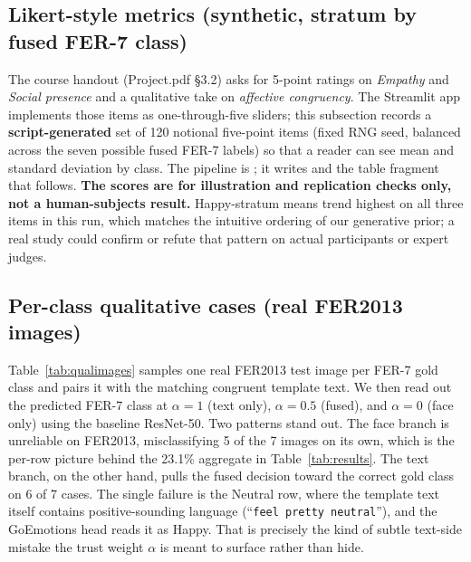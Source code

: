 \documentclass[sigconf,nonacm]{acmart}
\begin{document}
\subsection{Likert-style metrics (synthetic, stratum by fused FER-7 class)}
The course handout (Project.pdf \S3.2) asks for 5-point ratings on \emph{Empathy} and \emph{Social presence} and a qualitative take on \emph{affective congruency}. The Streamlit app implements those items as one-through-five sliders; this subsection records a \textbf{script-generated} set of 120 notional five-point items (fixed RNG seed, balanced across the seven possible fused FER-7 labels) so that a reader can see mean and standard deviation by class. The pipeline is ; it writes  and the table fragment that follows. \textbf{The scores are for illustration and replication checks only, not a human-subjects result.} Happy-stratum means trend highest on all three items in this run, which matches the intuitive ordering of our generative prior; a real study could confirm or refute that pattern on actual participants or expert judges.



\subsection{Per-class qualitative cases (real FER2013 images)}
Table~\ref{tab:qualimages} samples one real FER2013 test image per FER-7 gold class and pairs it with the matching congruent template text. We then read out the predicted FER-7 class at $\alpha\!=\!1$ (text only), $\alpha\!=\!0.5$ (fused), and $\alpha\!=\!0$ (face only) using the baseline ResNet-50. Two patterns stand out. The face branch is unreliable on FER2013, misclassifying 5 of the 7 images on its own, which is the per-row picture behind the 23.1\% aggregate in Table~\ref{tab:results}. The text branch, on the other hand, pulls the fused decision toward the correct gold class on 6 of 7 cases. The single failure is the Neutral row, where the template text itself contains positive-sounding language (``\texttt{feel pretty neutral}''), and the GoEmotions head reads it as Happy. That is precisely the kind of subtle text-side mistake the trust weight $\alpha$ is meant to surface rather than hide.
\end{document}
